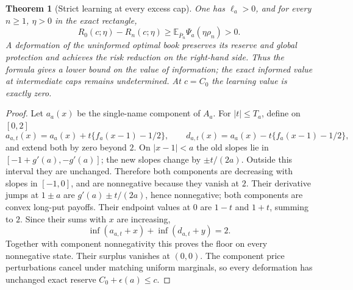 \documentclass[11pt,a4paper]{amsart}
\theoremstyle{plain}
\newtheorem{theorem}{Theorem}[section]
\theoremstyle{definition}
\theoremstyle{remark}
\newcommand{\EE}{\mathbb{E}}
\newcommand{\Ebar}{\EE_{\overline P_n}}
\begin{document}
\begin{theorem}[Strict learning at every excess cap]\label{thm:strictlearning}
One has $\ell_a>0$, and for every $n\ge1$, $\eta>0$ in the exact rectangle,
\begin{equation}\label{eq:strictgain}
 R_0(c;\eta)-R_n(c;\eta)\ge\Ebar\Psi_a(\eta\rho_n)>0.
\end{equation}
A deformation of the uninformed optimal book preserves its reserve and global protection and achieves the risk reduction on the right-hand side. Thus the formula gives a lower bound on the value of information; the exact informed value at intermediate caps remains undetermined. At $c=C_0$ the learning value is exactly zero.
\end{theorem}
\begin{proof}
Let $a_a(x)$ be the single-name component of $A_a$. For $|t|\le T_a$, define on $[0,2]$
\begin{equation}\label{eq:signeddeformation}
 a_{a,t}(x)=a_a(x)+t\{f_a(x-1)-1/2\},\qquad
 d_{a,t}(x)=a_a(x)-t\{f_a(x-1)-1/2\},
\end{equation}
and extend both by zero beyond $2$. On $|x-1|<a$ the old slopes lie in $[-1+g'(a),-g'(a)]$; the new slopes change by $\pm t/(2a)$. Outside this interval they are unchanged. Therefore both components are decreasing with slopes in $[-1,0]$, and are nonnegative because they vanish at $2$. Their derivative jumps at $1\pm a$ are $g'(a)\pm t/(2a)$, hence nonnegative; both components are convex long-put payoffs. Their endpoint values at $0$ are $1-t$ and $1+t$, summing to $2$. Since their sums with $x$ are increasing,
\[
 \inf(a_{a,t}+x)+\inf(d_{a,t}+y)=2.
\]
Together with component nonnegativity this proves the floor on every nonnegative state. Their surplus vanishes at $(0,0)$. The component price perturbations cancel under matching uniform marginals, so every deformation has unchanged exact reserve $C_0+\epsilon(a)\le c$.


\end{proof}
\end{document}
